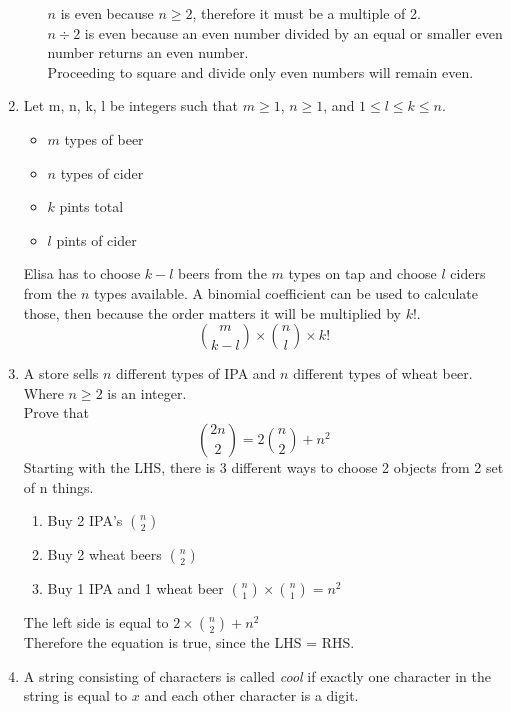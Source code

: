 \documentclass{article}
\begin{document}
\begin{enumerate}
\begin{itemize}
				$n$ is even because $n \geq 2$, therefore it must be a multiple of 2. \\
				$n \div 2$ is even because an even number divided by an equal or smaller even number returns an even number. \\
				Proceeding to square and divide only even numbers will remain even.
			\end{itemize}
		\item
			Let m, n, k, l be integers such that $m \geq 1$, $n \geq 1$, and $1 \leq l \leq k \leq n$. \\
			\begin{itemize}
				\item $m$ types of beer
				\item $n$ types of cider
				\item $k$ pints total
				\item $l$ pints of cider
			\end{itemize}
			Elisa has to choose $k - l$ beers from the $m$ types on tap and choose $l$ ciders from the $n$ types available. A binomial coefficient can be used to calculate those, then because the order matters it will be multiplied by $k!$. 
			\begin{equation*}
				{m \choose k - l} \times {n \choose l} \times k!
			\end{equation*}
		\item
			A store sells $n$ different types of IPA and $n$ different types of wheat beer. \\
			Where $n \geq 2$ is an integer. \\
			Prove that
			\begin{equation*}
				{2n \choose 2} = 2{n \choose 2} + n^2
			\end{equation*}
			Starting with the LHS, there is 3 different ways to choose 2 objects from 2 set of n things.
			\begin{enumerate}
				\item Buy 2 IPA's
				${n \choose 2}$
				\item Buy 2 wheat beers
				${n \choose 2}$
				\item Buy 1 IPA and 1 wheat beer
				${n \choose 1} \times {n \choose 1} = n^2$
			\end{enumerate}
			The left side is equal to $2 \times {n \choose 2} + n^2$ \\
			Therefore the equation is true, since the LHS = RHS. \\
		\item
			A string consisting of characters is called \emph{cool} if exactly one character in the string is equal to $x$ and each other character is a digit. \\

\end{enumerate}
\end{document}

